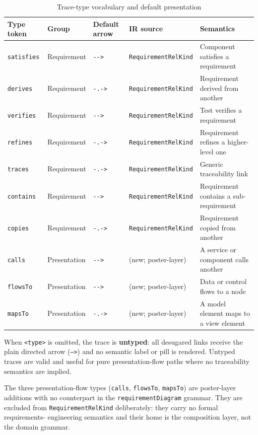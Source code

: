 \begin{table}[h]
\centering\small
\caption{Trace-type vocabulary and default presentation}
\begin{tabularx}{\textwidth}{p{2.2cm}p{2.2cm}p{1.6cm}p{2.2cm}X}
\toprule
\textbf{Type token} & \textbf{Group} & \textbf{Default arrow} & \textbf{IR source} & \textbf{Semantics} \\
\midrule
\texttt{satisfies}  & Requirement & \texttt{-{}-{}>}  & \texttt{RequirementRelKind} & Component satisfies a requirement \\
\texttt{derives}    & Requirement & \texttt{-.->} & \texttt{RequirementRelKind} & Requirement derived from another \\
\texttt{verifies}   & Requirement & \texttt{-{}-{}>}  & \texttt{RequirementRelKind} & Test verifies a requirement \\
\texttt{refines}    & Requirement & \texttt{-.->} & \texttt{RequirementRelKind} & Requirement refines a higher-level one \\
\texttt{traces}     & Requirement & \texttt{-.->} & \texttt{RequirementRelKind} & Generic traceability link \\
\texttt{contains}   & Requirement & \texttt{-{}-{}>}  & \texttt{RequirementRelKind} & Requirement contains a sub-requirement \\
\texttt{copies}     & Requirement & \texttt{-.->} & \texttt{RequirementRelKind} & Requirement copied from another \\
\midrule
\texttt{calls}      & Presentation & \texttt{-{}-{}>}  & (new; poster-layer) & A service or component calls another \\
\texttt{flowsTo}    & Presentation & \texttt{-{}-{}>}  & (new; poster-layer) & Data or control flows to a node \\
\texttt{mapsTo}     & Presentation & \texttt{-.->} & (new; poster-layer) & A model element maps to a view element \\
\bottomrule
\end{tabularx}
\label{tab:cdl-trace-types}
\end{table}

When \texttt{<type>} is omitted, the trace is \textbf{untyped}: all desugared
links receive the plain directed arrow (\texttt{-->}) and no semantic label or
pill is rendered.  Untyped traces are valid and useful for pure
presentation-flow paths where no traceability semantics are implied.

The three presentation-flow types (\texttt{calls}, \texttt{flowsTo},
\texttt{mapsTo}) are poster-layer additions with no counterpart in the
\texttt{requirementDiagram} grammar.  They are excluded from
\texttt{RequirementRelKind} deliberately: they carry no formal requirements-
engineering semantics and their home is the composition layer, not the domain
grammar.

